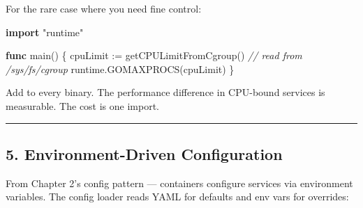 \documentclass[
]{article}
\newenvironment{Shaded}{}{}
\newcommand{\CommentTok}[1]{\textcolor[rgb]{0.38,0.63,0.69}{\textit{#1}}}
\newcommand{\KeywordTok}[1]{\textcolor[rgb]{0.00,0.44,0.13}{\textbf{#1}}}
\newcommand{\NormalTok}[1]{#1}
\newcommand{\OperatorTok}[1]{\textcolor[rgb]{0.40,0.40,0.40}{#1}}
\newcommand{\StringTok}[1]{\textcolor[rgb]{0.25,0.44,0.63}{#1}}
\begin{document}
For the rare case where you need fine control:

\begin{Shaded}
\begin{Highlighting}[]
\KeywordTok{import} \StringTok{"runtime"}

\KeywordTok{func}\NormalTok{ main}\OperatorTok{()} \OperatorTok{\{}
\NormalTok{    cpuLimit }\OperatorTok{:=}\NormalTok{ getCPULimitFromCgroup}\OperatorTok{()} \CommentTok{// read from /sys/fs/cgroup}
\NormalTok{    runtime}\OperatorTok{.}\NormalTok{GOMAXPROCS}\OperatorTok{(}\NormalTok{cpuLimit}\OperatorTok{)}
\OperatorTok{\}}
\end{Highlighting}
\end{Shaded}

Add to every binary. The performance difference in CPU-bound services is
measurable. The cost is one import.

\begin{center}\rule{0.5\linewidth}{0.5pt}\end{center}

\hypertarget{environment-driven-configuration}{%
\subsection{5. Environment-Driven
Configuration}\label{environment-driven-configuration}}

From Chapter 2's config pattern --- containers configure services via
environment variables. The config loader reads YAML for defaults and env
vars for overrides:
\end{document}
